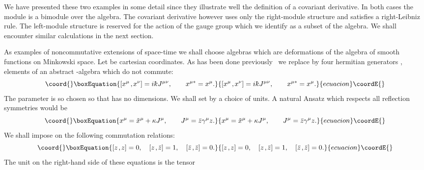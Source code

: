 \documentclass[a4paper,12pt]{article}
\def\t#1{\tilde #1}
\def\c#1{{\cal #1}}
\def\kbar{{\mathchar'26\mkern-9muk}}
\def\t#1{\tilde #1}
\def\k{\kern-.1em\mathbin{,}\kern-.1em}
\begin{document}
We have presented these two examples in some detail since they
illustrate well the definition of a covariant derivative. In both
cases the module is a bimodule over the algebra.  The covariant
derivative however uses only the right-module structure and satisfies
a right-Leibniz rule. The left-module structure is reserved for the
action of the gauge group which we identify as a subset of the
algebra. We shall encounter similar calculations in the next section.

As examples of noncommutative extensions of space-time we shall choose
algebras which are deformations of the algebra of smooth functions on
Minkowski space. Let \myHighlight{$\t{x}^{\mu}$}\coordHE{} be cartesian coordinates. As has been
done previously~\cite{Sny47a,Mad89c,DopFreRob95} we replace \myHighlight{$\t{x}^{\mu}$}\coordHE{}
by four hermitian generators \coordHE{}, elements of an abstract
\myHighlight{$*$}\coordHE{}-algebra \myHighlight{$\c{A}$}\coordHE{} which do not commute:
\begin{equation}\coord{}\boxEquation{
[x^{\mu}\k x^{\nu}] = i\kbar J^{\mu\nu},   \qquad  
x^{\mu *} = x^{\mu}.                                          \label{sec:2}
}{
[x^{\mu}\k x^{\nu}] = i\kbar J^{\mu\nu},   \qquad  
x^{\mu *} = x^{\mu}.                                          }{ecuacion}\coordE{}\end{equation}
The parameter \myHighlight{$\kbar$}\coordHE{} is so chosen so that \coordHE{} has no
dimensions.  We shall set \myHighlight{$\kbar = 1$}\coordHE{} by a choice of units.
A natural Ansatz which respects all reflection symmetries would be
\begin{equation}\coord{}\boxEquation{
x^{\mu} = \t{x}^{\mu} + \kappa J^{\mu}, \qquad
J^{\mu} = \bar z \gamma^{\mu} z.                               \label{8.1.4}
}{
x^{\mu} = \t{x}^{\mu} + \kappa J^{\mu}, \qquad
J^{\mu} = \bar z \gamma^{\mu} z.                               }{ecuacion}\coordE{}\end{equation}
We shall impose on \coordHE{} the following commutation relations:
\begin{equation}\coord{}\boxEquation{
[ z\k z] = 0, \quad [z\k \bar z ] = 1, \quad [\bar z\k \bar z ] = 0. 
                                                               \label{8.1.5}
}{
[ z\k z] = 0, \quad [z\k \bar z ] = 1, \quad [\bar z\k \bar z ] = 0. 
                                                               }{ecuacion}\coordE{}\end{equation}
The unit on the right-hand side of these equations is the tensor
\end{document}
